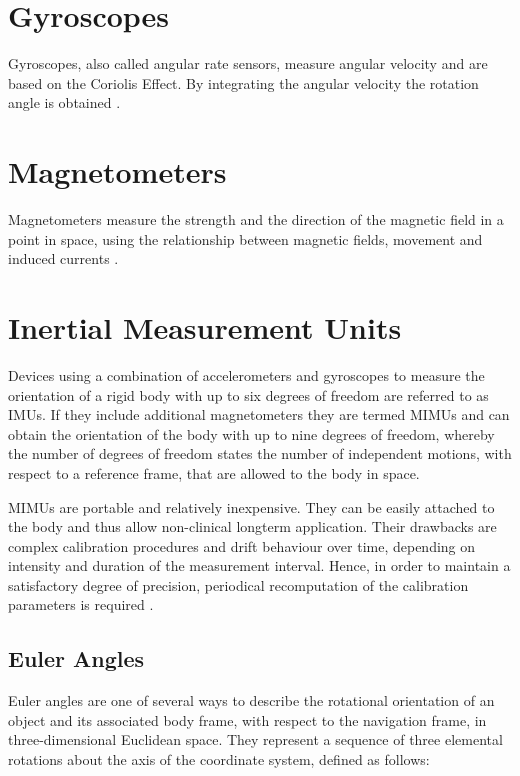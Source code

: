 \section{Gyroscopes}

Gyroscopes, also called angular rate sensors, measure angular velocity and are based on the Coriolis Effect. By integrating the angular velocity the rotation angle is obtained \cite{olivares_vicente_signal_2013}.

\section{Magnetometers}

Magnetometers measure the strength and the direction of the magnetic field in a point in space, using the relationship between magnetic fields, movement and induced currents \cite{olivares_vicente_signal_2013}.

\section{Inertial Measurement Units}

Devices using a combination of accelerometers and gyroscopes to measure the orientation of a rigid body with up to six degrees of freedom are referred to as \glspl{IMU}. If they include additional magnetometers they are termed \glspl{MIMU} and can obtain the orientation of the body with up to nine degrees of freedom, whereby the number of degrees of freedom states the number of independent motions, with respect to a reference frame, that are allowed to the body in space.

\glspl{MIMU} are portable and relatively inexpensive. They can be easily attached to the body and thus allow non-clinical longterm application. Their drawbacks are complex calibration procedures and drift behaviour over time, depending on intensity and duration of the measurement interval. Hence, in order to maintain a satisfactory degree of precision, periodical recomputation of the calibration parameters is required \cite{olivares_vicente_signal_2013}.

\subsection{Euler Angles}

Euler angles are one of several ways to describe the rotational orientation of an object and its associated body frame, with respect to the navigation frame, in three-dimensional Euclidean space. They represent a sequence of three elemental rotations about the axis of the coordinate system, defined as follows:

